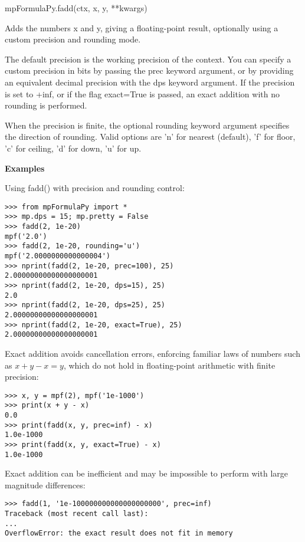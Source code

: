 \vspace{0.3cm}

mpFormulaPy.fadd(ctx, x, y, **kwargs)

\vpara
Adds the numbers x and y, giving a floating-point result, optionally using a custom precision and rounding mode.

\vpara
The default precision is the working precision of the context. You can specify a custom precision in bits by passing the prec keyword argument, or by providing an equivalent decimal precision with the dps keyword argument. If the precision is set to +inf, or if the
flag exact=True is passed, an exact addition with no rounding is performed.

\vpara
When the precision is finite, the optional rounding keyword argument specifies the direction of rounding. Valid options are 'n' for nearest (default), 'f' for floor, 'c' for ceiling, 'd' for down, 'u' for up.

\vpara
\textbf{Examples}

Using fadd() with precision and rounding control:

\begin{lstlisting}
>>> from mpFormulaPy import *
>>> mp.dps = 15; mp.pretty = False
>>> fadd(2, 1e-20)
mpf('2.0')
>>> fadd(2, 1e-20, rounding='u')
mpf('2.0000000000000004')
>>> nprint(fadd(2, 1e-20, prec=100), 25)
2.00000000000000000001
>>> nprint(fadd(2, 1e-20, dps=15), 25)
2.0
>>> nprint(fadd(2, 1e-20, dps=25), 25)
2.00000000000000000001
>>> nprint(fadd(2, 1e-20, exact=True), 25)
2.00000000000000000001
\end{lstlisting}


Exact addition avoids cancellation errors, enforcing familiar laws of numbers such as $x+y-x=y$, which do not hold in floating-point arithmetic with finite precision:

\begin{lstlisting}
>>> x, y = mpf(2), mpf('1e-1000')
>>> print(x + y - x)
0.0
>>> print(fadd(x, y, prec=inf) - x)
1.0e-1000
>>> print(fadd(x, y, exact=True) - x)
1.0e-1000
\end{lstlisting}


Exact addition can be inefficient and may be impossible to perform with large magnitude differences:

\begin{lstlisting}
>>> fadd(1, '1e-100000000000000000000', prec=inf)
Traceback (most recent call last):
...
OverflowError: the exact result does not fit in memory
\end{lstlisting}





